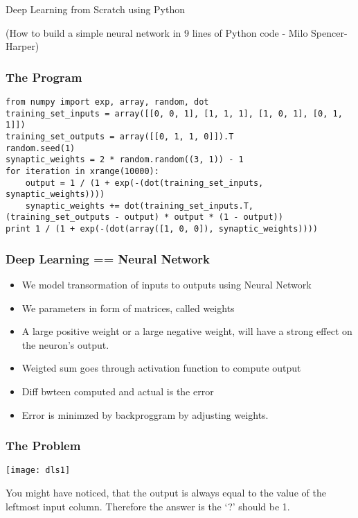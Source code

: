 \begin{frame}[fragile]\frametitle{}
\begin{center}
{\Large  Deep Learning from Scratch using Python}
\end{center}
{\tiny (How to build a simple neural network in 9 lines of Python code - Milo Spencer-Harper)}
\end{frame}


\begin{frame}[fragile]\frametitle{The Program}
\begin{lstlisting}
from numpy import exp, array, random, dot
training_set_inputs = array([[0, 0, 1], [1, 1, 1], [1, 0, 1], [0, 1, 1]])
training_set_outputs = array([[0, 1, 1, 0]]).T
random.seed(1)
synaptic_weights = 2 * random.random((3, 1)) - 1
for iteration in xrange(10000):
    output = 1 / (1 + exp(-(dot(training_set_inputs, synaptic_weights))))
    synaptic_weights += dot(training_set_inputs.T, (training_set_outputs - output) * output * (1 - output))
print 1 / (1 + exp(-(dot(array([1, 0, 0]), synaptic_weights))))
\end{lstlisting}
\end{frame}

\begin{frame}[fragile] \frametitle{Deep Learning == Neural Network}

\begin{itemize}
\item We model transormation of inputs to outputs using Neural Network
\item We parameters in form of matrices, called weights
\item A large positive weight or a large negative weight, will have a strong effect on the neuron's output.
\item Weigted sum goes through activation function to compute output
\item Diff bwteen computed and actual is the error
\item Error is minimzed by backproggram by adjusting weights. 
\end{itemize}
\end{frame}

\begin{frame}[fragile]\frametitle{The Problem}
\begin{center}
\texttt{[image: dls1]}
\end{center}
You might have noticed, that the output is always equal to the value of the leftmost input column. Therefore the answer is the `?' should be 1.
\end{frame}

